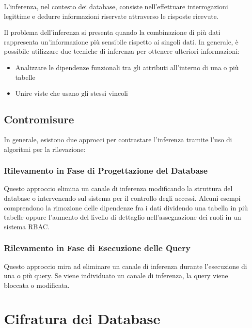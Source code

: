 L'inferenza, nel contesto dei database, consiste nell'effettuare interrogazioni legittime e dedurre informazioni riservate attraverso le risposte ricevute.

Il problema dell'inferenza si presenta quando la combinazione di più dati rappresenta un'informazione più sensibile rispetto ai singoli dati. In generale, è possibile utilizzare due tecniche di inferenza per ottenere ulteriori informazioni:

\begin{itemize}
    \item Analizzare le dipendenze funzionali tra gli attributi all'interno di una o più tabelle
    \item Unire viste che usano gli stessi vincoli
\end{itemize}

\subsection{Contromisure}

In generale, esistono due approcci per contrastare l'inferenza tramite l'uso di algoritmi per la rilevazione:

\subsubsection{Rilevamento in Fase di Progettazione del Database}

Questo approccio elimina un canale di inferenza modificando la struttura del database o intervenendo sul sistema per il controllo degli accessi. Alcuni esempi comprendono la rimozione delle dipendenze fra i dati dividendo una tabella in più tabelle oppure l'aumento del livello di dettaglio nell'assegnazione dei ruoli in un sistema RBAC.

\subsubsection{Rilevamento in Fase di Esecuzione delle Query}

Questo approccio mira ad eliminare un canale di inferenza durante l'esecuzione di una o più query. Se viene individuato un canale di inferenza, la query viene bloccata o modificata.

\section{Cifratura dei Database}

